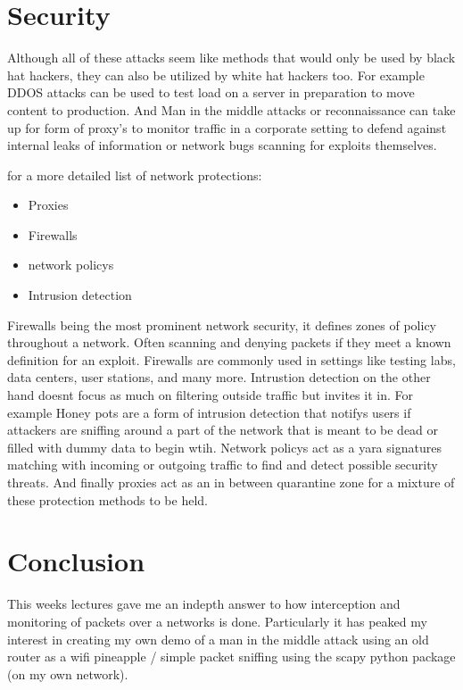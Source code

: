 \documentclass[letterpaper,12pt,titlepage,onecolumn]{IEEEtran}
\begin{document}
\section{Security}
Although all of these attacks seem like methods that would only be used by black hat hackers, they can also be utilized by white hat hackers too. For example DDOS attacks can be used to test load on a server in preparation to move content to production. And Man in the middle attacks or reconnaissance can take up for form of proxy's  to monitor traffic in a corporate setting to defend against internal leaks of information or network bugs scanning for exploits themselves.\par
for a more detailed list of network protections:
\begin{itemize}
    \item Proxies
    \item Firewalls
    \item network policys
    \item Intrusion detection
\end{itemize}

Firewalls being the most prominent network security, it defines zones of policy throughout a network. Often scanning and denying packets if they meet a known definition for an exploit. Firewalls are commonly used in settings like testing labs, data centers, user stations, and many more. Intrustion detection on the other hand doesnt focus as much on filtering outside traffic but invites it in. For example Honey pots are a form of intrusion detection that notifys users if attackers are sniffing around a part of the network that is meant to be dead or filled with dummy data to begin wtih. Network policys act as a yara signatures matching with incoming or outgoing traffic to find and detect possible security threats. And finally proxies act as an in between quarantine zone for a mixture of these protection methods to be held.

\section{Conclusion}
This weeks lectures gave me an indepth answer to how interception and monitoring of packets over a networks is done. Particularly it has peaked my interest in creating my own demo of a man in the middle attack using an old router as a wifi pineapple / simple packet sniffing using the scapy python package (on my own network). 
\end{document}
